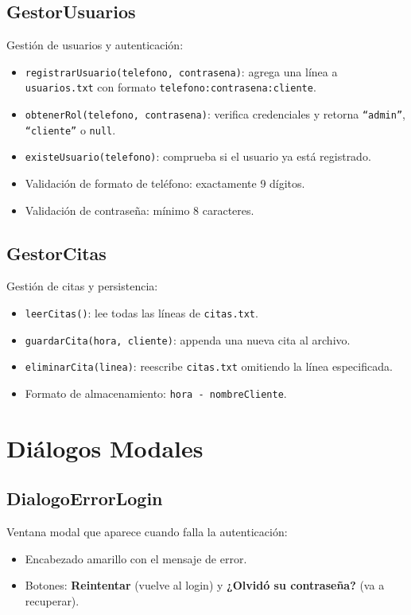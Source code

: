 \documentclass[12pt,a4paper]{report}
\begin{document}
\subsection{GestorUsuarios}
Gestión de usuarios y autenticación:
\begin{itemize}
    \item \texttt{registrarUsuario(telefono, contrasena)}: agrega una línea a \texttt{usuarios.txt} con formato \texttt{telefono:contrasena:cliente}.
    \item \texttt{obtenerRol(telefono, contrasena)}: verifica credenciales y retorna \texttt{``admin''}, \texttt{``cliente''} o \texttt{null}.
    \item \texttt{existeUsuario(telefono)}: comprueba si el usuario ya está registrado.
    \item Validación de formato de teléfono: exactamente 9 dígitos.
    \item Validación de contraseña: mínimo 8 caracteres.
\end{itemize}

\subsection{GestorCitas}
Gestión de citas y persistencia:
\begin{itemize}
    \item \texttt{leerCitas()}: lee todas las líneas de \texttt{citas.txt}.
    \item \texttt{guardarCita(hora, cliente)}: appenda una nueva cita al archivo.
    \item \texttt{eliminarCita(linea)}: reescribe \texttt{citas.txt} omitiendo la línea especificada.
    \item Formato de almacenamiento: \texttt{hora - nombreCliente}.
\end{itemize}

\section{Diálogos Modales}

\subsection{DialogoErrorLogin}
Ventana modal que aparece cuando falla la autenticación:
\begin{itemize}
    \item Encabezado amarillo con el mensaje de error.
    \item Botones: \textbf{Reintentar} (vuelve al login) y \textbf{¿Olvidó su contraseña?} (va a recuperar).
\end{itemize}
\end{document}
